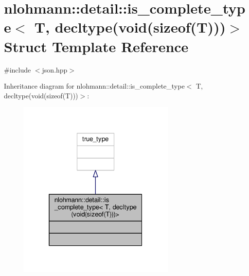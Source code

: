 \hypertarget{structnlohmann_1_1detail_1_1is__complete__type_3_01T_00_01decltype_07void_07sizeof_07T_08_08_08_4}{}\section{nlohmann\+:\+:detail\+:\+:is\+\_\+complete\+\_\+type$<$ T, decltype(void(sizeof(T)))$>$ Struct Template Reference}
\label{structnlohmann_1_1detail_1_1is__complete__type_3_01T_00_01decltype_07void_07sizeof_07T_08_08_08_4}


{\ttfamily \#include $<$json.\+hpp$>$}



Inheritance diagram for nlohmann\+:\+:detail\+:\+:is\+\_\+complete\+\_\+type$<$ T, decltype(void(sizeof(T)))$>$\+:
\nopagebreak
\begin{figure}[H]
\begin{center}
\leavevmode
\includegraphics[width=223pt]{structnlohmann_1_1detail_1_1is__complete__type_3_01T_00_01decltype_07void_07sizeof_07T_08_08_08_4__inherit__graph}
\end{center}
\end{figure}


